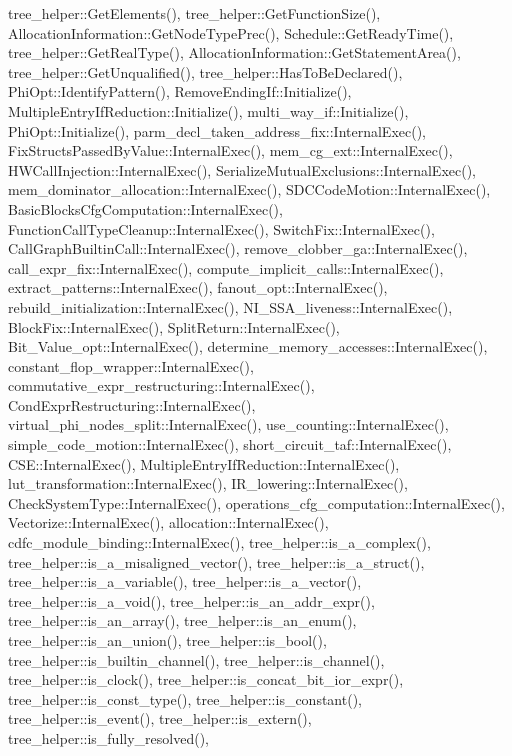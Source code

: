 tree\+\_\+helper\+::\+Get\+Elements(), tree\+\_\+helper\+::\+Get\+Function\+Size(), Allocation\+Information\+::\+Get\+Node\+Type\+Prec(), Schedule\+::\+Get\+Ready\+Time(), tree\+\_\+helper\+::\+Get\+Real\+Type(), Allocation\+Information\+::\+Get\+Statement\+Area(), tree\+\_\+helper\+::\+Get\+Unqualified(), tree\+\_\+helper\+::\+Has\+To\+Be\+Declared(), Phi\+Opt\+::\+Identify\+Pattern(), Remove\+Ending\+If\+::\+Initialize(), Multiple\+Entry\+If\+Reduction\+::\+Initialize(), multi\+\_\+way\+\_\+if\+::\+Initialize(), Phi\+Opt\+::\+Initialize(), parm\+\_\+decl\+\_\+taken\+\_\+address\+\_\+fix\+::\+Internal\+Exec(), Fix\+Structs\+Passed\+By\+Value\+::\+Internal\+Exec(), mem\+\_\+cg\+\_\+ext\+::\+Internal\+Exec(), H\+W\+Call\+Injection\+::\+Internal\+Exec(), Serialize\+Mutual\+Exclusions\+::\+Internal\+Exec(), mem\+\_\+dominator\+\_\+allocation\+::\+Internal\+Exec(), S\+D\+C\+Code\+Motion\+::\+Internal\+Exec(), Basic\+Blocks\+Cfg\+Computation\+::\+Internal\+Exec(), Function\+Call\+Type\+Cleanup\+::\+Internal\+Exec(), Switch\+Fix\+::\+Internal\+Exec(), Call\+Graph\+Builtin\+Call\+::\+Internal\+Exec(), remove\+\_\+clobber\+\_\+ga\+::\+Internal\+Exec(), call\+\_\+expr\+\_\+fix\+::\+Internal\+Exec(), compute\+\_\+implicit\+\_\+calls\+::\+Internal\+Exec(), extract\+\_\+patterns\+::\+Internal\+Exec(), fanout\+\_\+opt\+::\+Internal\+Exec(), rebuild\+\_\+initialization\+::\+Internal\+Exec(), N\+I\+\_\+\+S\+S\+A\+\_\+liveness\+::\+Internal\+Exec(), Block\+Fix\+::\+Internal\+Exec(), Split\+Return\+::\+Internal\+Exec(), Bit\+\_\+\+Value\+\_\+opt\+::\+Internal\+Exec(), determine\+\_\+memory\+\_\+accesses\+::\+Internal\+Exec(), constant\+\_\+flop\+\_\+wrapper\+::\+Internal\+Exec(), commutative\+\_\+expr\+\_\+restructuring\+::\+Internal\+Exec(), Cond\+Expr\+Restructuring\+::\+Internal\+Exec(), virtual\+\_\+phi\+\_\+nodes\+\_\+split\+::\+Internal\+Exec(), use\+\_\+counting\+::\+Internal\+Exec(), simple\+\_\+code\+\_\+motion\+::\+Internal\+Exec(), short\+\_\+circuit\+\_\+taf\+::\+Internal\+Exec(), C\+S\+E\+::\+Internal\+Exec(), Multiple\+Entry\+If\+Reduction\+::\+Internal\+Exec(), lut\+\_\+transformation\+::\+Internal\+Exec(), I\+R\+\_\+lowering\+::\+Internal\+Exec(), Check\+System\+Type\+::\+Internal\+Exec(), operations\+\_\+cfg\+\_\+computation\+::\+Internal\+Exec(), Vectorize\+::\+Internal\+Exec(), allocation\+::\+Internal\+Exec(), cdfc\+\_\+module\+\_\+binding\+::\+Internal\+Exec(), tree\+\_\+helper\+::is\+\_\+a\+\_\+complex(), tree\+\_\+helper\+::is\+\_\+a\+\_\+misaligned\+\_\+vector(), tree\+\_\+helper\+::is\+\_\+a\+\_\+struct(), tree\+\_\+helper\+::is\+\_\+a\+\_\+variable(), tree\+\_\+helper\+::is\+\_\+a\+\_\+vector(), tree\+\_\+helper\+::is\+\_\+a\+\_\+void(), tree\+\_\+helper\+::is\+\_\+an\+\_\+addr\+\_\+expr(), tree\+\_\+helper\+::is\+\_\+an\+\_\+array(), tree\+\_\+helper\+::is\+\_\+an\+\_\+enum(), tree\+\_\+helper\+::is\+\_\+an\+\_\+union(), tree\+\_\+helper\+::is\+\_\+bool(), tree\+\_\+helper\+::is\+\_\+builtin\+\_\+channel(), tree\+\_\+helper\+::is\+\_\+channel(), tree\+\_\+helper\+::is\+\_\+clock(), tree\+\_\+helper\+::is\+\_\+concat\+\_\+bit\+\_\+ior\+\_\+expr(), tree\+\_\+helper\+::is\+\_\+const\+\_\+type(), tree\+\_\+helper\+::is\+\_\+constant(), tree\+\_\+helper\+::is\+\_\+event(), tree\+\_\+helper\+::is\+\_\+extern(), tree\+\_\+helper\+::is\+\_\+fully\+\_\+resolved(), 
